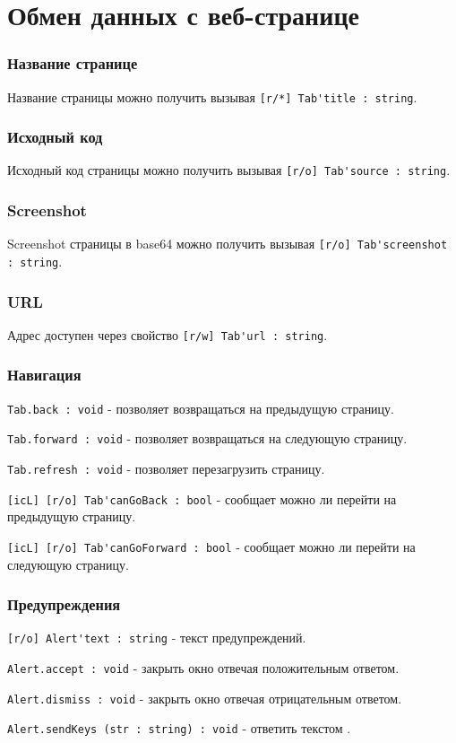 \section{Обмен данных с веб-странице}
\label{dataexchange}

\subsubsection{Название странице}

Название страницы можно получить вызывая \lstinline|[r/*] Tab'title : string|.

\subsubsection{Исходный код}

Исходный код страницы можно получить вызывая \lstinline|[r/o] Tab'source : string|.

\subsubsection{Screenshot}

Screenshot страницы в base64 можно получить вызывая \lstinline|[r/o] Tab'screenshot : string|.

\subsubsection{URL}

Адрес доступен через свойство \lstinline|[r/w] Tab'url : string|.

\subsubsection{Навигация}

\lstinline|Tab.back : void| - позволяет возвращаться на предыдущую страницу.

\lstinline|Tab.forward : void| - позволяет возвращаться на следующую страницу.

\lstinline|Tab.refresh : void| -  позволяет перезагрузить страницу.

\lstinline|[icL] [r/o] Tab'canGoBack : bool| - сообщает можно ли перейти на предыдущую страницу.

\lstinline|[icL] [r/o] Tab'canGoForward : bool| - сообщает можно ли перейти на следующую страницу.


\subsubsection{Предупреждения}

\lstinline|[r/o] Alert'text : string| - текст предупреждений.

\lstinline|Alert.accept : void| - закрыть окно отвечая положительным ответом.

\lstinline|Alert.dismiss : void| - закрыть окно отвечая отрицательным ответом.

\lstinline|Alert.sendKeys (str : string) : void| - ответить текстом .


